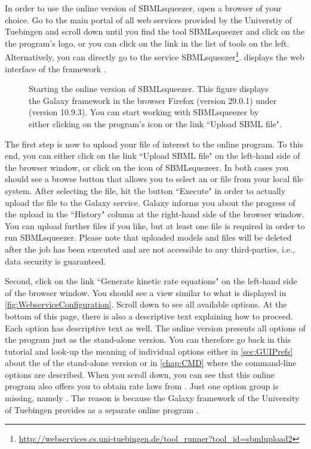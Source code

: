 In order to use the online version of SBMLsqueezer, open a browser of your choice.
Go to the main portal of all web services provided by the Universtiy of Tuebingen
and scroll down until you find the tool SBMLsqueezer and click on the the program's logo, or you can click on the link in the list of tools on the left.
Alternatively, you can directly go to the service SBMLsqueezer\footnote{\url{http://webservices.cs.uni-tuebingen.de/tool_runner?tool_id=sbmlupload2}}.
 displays the web interface of the \Galaxy framework \citep{Goecks2010}.
\begin{figure}
\caption[Starting the online version of SBMLsqueezer]{Starting the online version of SBMLsqueezer.
This figure displays the Galaxy framework in the browser Firefox (version 29.0.1) under \MacOSX (version 10.9.3).
You can start working with SBMLsqueezer by either clicking on the program's icon or the link ``Upload SBML file".}
\label{fig:WebserviceLaunch}
\end{figure}

The first step is now to upload your \SBML file of interest to the online program.
To this end, you can either click on the link ``Upload SBML file" on the left-hand side of the browser window, or click on the icon of SBMLsquezeer.
In both cases you should see a browse button that allows you to select an \XML or \SBML file from your local file system.
After selecting the file, hit the button ``Execute" in order to actually upload the file to the Galaxy service.
Galaxy informs you about the progress of the upload in the ``History" column at the right-hand side of the browser window.
You can upload further files if you like, but at least one file is required in order to run SBMLsqueezer.
Please note that uploaded models and files will be deleted after the job has been executed and are not accessible to any third-parties, i.e., data security is guaranteed.

Second, click on the link ``Generate kinetic rate equations" on the left-hand side of the browser window.
You should see a view similar to what is displayed in \vref{fig:WebserviceConfiguration}.
Scroll down to see all available options.
At the bottom of this page, there is also a descriptive text explaining how to proceed.
Each option has descriptive text as well.
The online version presents all options of the program just as the stand-alone version.
You can therefore go back in this tutorial and look-up the meaning of individual options either in \vref{sec:GUIPrefs} about the \GUI of the stand-alone version or in \vref{chap:CMD} where the command-line options are described.
When you scroll down, you can see that this online program also offers you to obtain rate laws from \SABIO.
Just one option group is missing, namely \SBMLLaTeX.
The reason is because the Galaxy framework of the University of Tuebingen provides \SBMLLaTeX as a separate online program \citep{Draeger2009b}.

